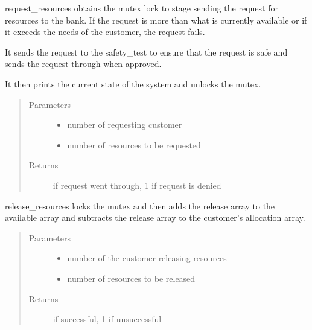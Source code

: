 \documentclass[letterpaper,10pt,english,openany,oneside]{sphinxmanual}
\begin{document}
\begin{fulllineitems}
request\_resources obtains the mutex lock to stage sending the request for
resources to the bank. If the request is more than what is currently
available or if it exceeds the needs of the customer, the request fails.

It sends the request to the safety\_test to ensure that the request is safe
and sends the request through when approved.

It then prints the current state of the system and unlocks the mutex.
\begin{quote}\begin{description}
\item[{Parameters}] \leavevmode\begin{itemize}
\item {} 
 \textendash{} number of requesting customer

\item {} 
 \textendash{} number of resources to be requested

\end{itemize}

\item[{Returns}]  if request went through, \sphinxhyphen{}1 if request is denied

\end{description}\end{quote}

\end{fulllineitems}



\begin{fulllineitems}
release\_resources locks the mutex and then adds the release array to the
available array and subtracts the release array to the customer’s allocation
array.
\begin{quote}\begin{description}
\item[{Parameters}] \leavevmode\begin{itemize}
\item {} 
 \textendash{} number of the customer releasing resources

\item {} 
 \textendash{} number of resources to be released

\end{itemize}

\item[{Returns}]  if successful, \sphinxhyphen{}1 if unsuccessful

\end{description}\end{quote}

\end{fulllineitems}
\end{document}

